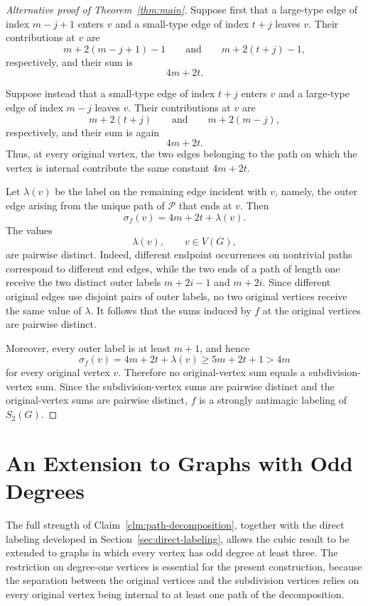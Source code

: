 \documentclass[preprint,12pt]{elsarticle}
\begin{document}
\begin{proof}[Alternative proof of Theorem~\ref{thm:main}]
Suppose first that a large-type edge of index \(m-j+1\) enters \(v\) and
a small-type edge of index \(t+j\) leaves \(v\). Their contributions at
\(v\) are
\[
m+2(m-j+1)-1
\qquad\text{and}\qquad
m+2(t+j)-1,
\]
respectively, and their sum is
\[
4m+2t.
\]

Suppose instead that a small-type edge of index \(t+j\) enters \(v\) and
a large-type edge of index \(m-j\) leaves \(v\). Their contributions at
\(v\) are
\[
m+2(t+j)
\qquad\text{and}\qquad
m+2(m-j),
\]
respectively, and their sum is again
\[
4m+2t.
\]
Thus, at every original vertex, the two edges belonging to the path on
which the vertex is internal contribute the same constant \(4m+2t\).

Let \(\lambda(v)\) be the label on the remaining edge incident with
\(v\), namely, the outer edge arising from the unique path of
\(\mathcal P\) that ends at \(v\). Then
\[
\sigma_f(v)=4m+2t+\lambda(v).
\]
The values
\[
\lambda(v),\qquad v\in V(G),
\]
are pairwise distinct. Indeed, different endpoint occurrences on
nontrivial paths correspond to different end edges, while the two ends of
a path of length one receive the two distinct outer labels \(m+2i-1\)
and \(m+2i\). Since different original edges use disjoint pairs of outer
labels, no two original vertices receive the same value of \(\lambda\).
It follows that the sums induced by \(f\) at the original vertices are
pairwise distinct.

Moreover, every outer label is at least \(m+1\), and hence
\[
\sigma_f(v)
=
4m+2t+\lambda(v)
\ge
5m+2t+1
>
4m
\]
for every original vertex \(v\). Therefore no original-vertex sum equals
a subdivision-vertex sum. Since the subdivision-vertex sums are pairwise
distinct and the original-vertex sums are pairwise distinct, \(f\) is a
strongly antimagic labeling of \(S_2(G)\).
\end{proof}


\section{An Extension to Graphs with Odd Degrees}
\label{sec:odd-degree-extension}

The full strength of Claim~\ref{clm:path-decomposition}, together with
the direct labeling developed in Section~\ref{sec:direct-labeling},
allows the cubic result to be extended to graphs in which every vertex
has odd degree at least three. The restriction on degree-one vertices is
essential for the present construction, because the separation between
the original vertices and the subdivision vertices relies on every
original vertex being internal to at least one path of the decomposition.
\end{document}
